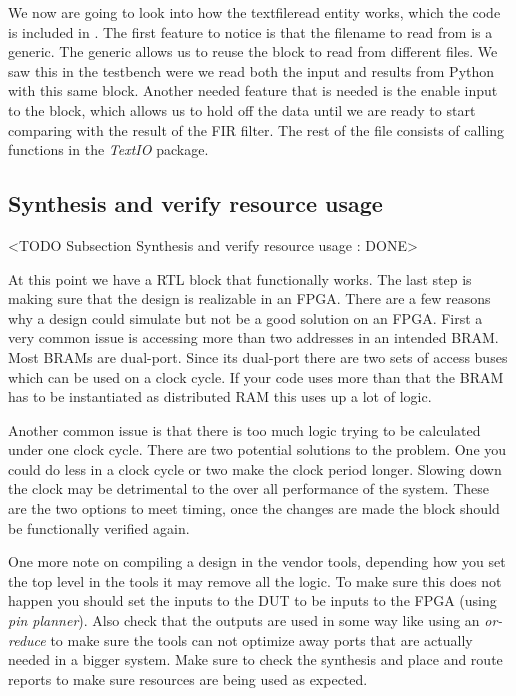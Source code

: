We now are going to look into how the textfileread entity works, which the code is included in . The first feature to notice is that the filename to read from is a generic. The generic allows us to reuse the block to read from different files. We saw this in the testbench were we read both the input and results from Python with this same block. Another needed feature that is needed is the enable input to the block, which allows us to hold off the data until we are ready to start comparing with the result of the \ac{FIR} filter. The rest of the file consists of calling functions in the \emph{TextIO} package.
	
\subsection{Synthesis and verify resource usage}
	<TODO Subsection Synthesis and verify resource usage : DONE>

At this point we have a \ac{RTL} block that functionally works. The last step is making sure that the design is realizable in an \ac{FPGA}. There are a few reasons why a design could simulate but not be a good solution on an \ac{FPGA}. First a very common issue is accessing more than two addresses in an intended \ac{BRAM}. Most \ac{BRAM}s are dual-port. Since its dual-port there are two sets of access buses which can be used on a clock cycle. If your code uses more than that the \ac{BRAM} has to be instantiated as distributed \ac{RAM} this uses up a lot of logic.

Another common issue is that there is too much logic trying to be calculated under one clock cycle. There are two potential solutions to the problem. One you could do less in a clock cycle or two make the clock period longer. Slowing down the clock may be detrimental to the over all performance of the system. These are the two options to meet timing, once the changes are made the block should be functionally verified again.  

One more note on compiling a design in the vendor tools, depending how you set the top level in the tools it may remove all the logic. To make sure this does not happen you should set the inputs to the \ac{DUT} to be inputs to the FPGA (using \emph{pin planner}). Also check that the outputs are used in some way like using an \emph{or-reduce} to make sure the tools can not optimize away ports that are actually needed in a bigger system. Make sure to check the synthesis and place and route reports to make sure resources are being used as expected. 
		
